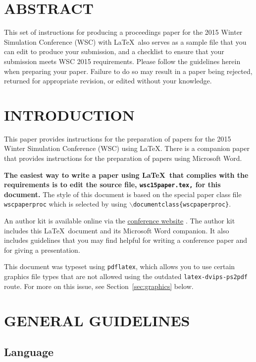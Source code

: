 \documentclass{wscpaperproc}
\theoremstyle{wsc}
\begin{document}
\section*{ABSTRACT}
This set of instructions for producing a proceedings paper for the 2015
Winter Simulation Conference (WSC) with \LaTeX\ also serves as a sample file that you can edit to
produce your submission, and a checklist to ensure that your submission
meets WSC 2015 requirements. Please follow the guidelines herein when preparing your
paper. Failure to do so may result in a paper being rejected, returned for
appropriate revision, or edited without your knowledge.

\section{INTRODUCTION}
\label{sec:intro}

This paper provides instructions for the preparation of papers for the 2015
Winter Simulation Conference (WSC) using \LaTeX. There is a companion paper that
provides instructions for the preparation of papers using Microsoft Word.

\textbf{The easiest way to write a paper using \LaTeX\ that complies with the
requirements is to edit the source file, {\tt wsc15paper.tex,} for this document.}
The style of this document is based on the special paper class file {\tt wscpaperproc} which is selected by using {\tt $\backslash$documentclass\{wscpaperproc\}}.

An author kit is available online via the  \href{http://www.wintersim.org}%
{conference website} \cite{WSC}.
The author kit includes this \LaTeX\ document and its Microsoft Word companion.
It also includes guidelines that you may find helpful for writing a conference paper and for giving a presentation.

This document was typeset using {\tt pdflatex}, which allows you to use certain
graphics file types that are not allowed using the outdated {\tt latex-dvips-ps2pdf} route.
For more on this issue, see Section~\ref{sec:graphics} below.

\section{GENERAL GUIDELINES}

\subsection{Language}
\end{document}
